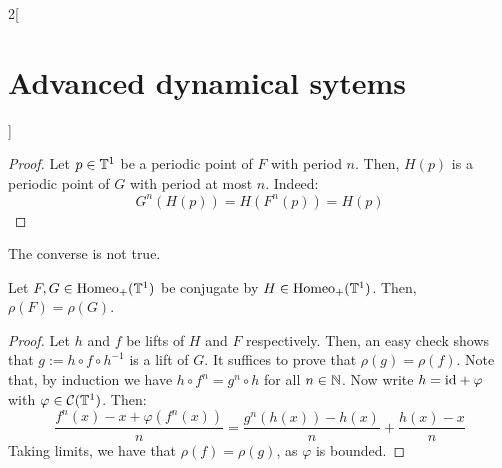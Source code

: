 \documentclass[../../../main_math.tex]{subfiles}
\begin{document}
\begin{multicols}{2}[\section{Advanced dynamical sytems}]
\begin{lemma}
  \end{lemma}
  \begin{proof}
    Let $p\in \mathbb{T}^1$ be a periodic point of $F$ with period $n$. Then, $H(p)$ is a periodic point of $G$ with period at most $n$. Indeed:
    $$
      G^n(H(p))=H(F^n(p))=H(p)
    $$
  \end{proof}
  \begin{remark}
    The converse is not true.
  \end{remark}
  \begin{theorem}\label{ADS:invariance_rho}
    Let $F,G\in\mathrm{Homeo}_+(\mathbb{T}^1)$ be conjugate by $H\in \mathrm{Homeo}_+(\mathbb{T}^1)$. Then, $\rho(F)=\rho(G)$.
  \end{theorem}
  \begin{proof}
    Let $h$ and $f$ be lifts of $H$ and $F$ respectively. Then, an easy check shows that $g:=h\circ f\circ h^{-1}$ is a lift of $G$. It suffices to prove that $\rho(g)=\rho(f)$. Note that, by induction we have $h\circ f^n=g^n\circ h$ for all $n\in\mathbb{N}$. Now write $h=\mathrm{id} + \varphi$ with $\varphi\in \mathcal{C}(\mathbb{T}^1)$. Then:
    \begin{equation*}
      \frac{f^n(x)-x+\varphi(f^n(x))}{n}= \frac{g^n(h(x))-h(x)}{n}+\frac{h(x)-x}{n}
    \end{equation*}
    Taking limits, we have that $\rho(f)=\rho(g)$, as $\varphi$ is bounded.
  \end{proof}

\end{multicols}
\end{document}

